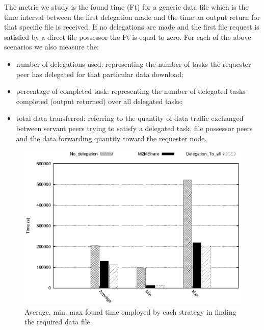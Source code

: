 The metric we study is the found time (Ft) for a generic data file which is the time interval between the first delegation made and the time an output return for that specific file is
received. If no delegations are made and the first file request is satisfied by a direct file possessor the Ft is equal to zero. For each of the above scenarios we also measure the:
\begin{itemize}
\item number of delegations used: representing the number of tasks the requester peer has delegated for that particular data download;
\item percentage of completed task: representing the number of delegated tasks completed (output returned) over all delegated tasks;
\item total data transferred: referring to the quantity of data traffic exchanged between servant peers trying to satisfy a delegated task, file possessor peers and the data forwarding quantity toward the requester node.
\end{itemize}

\begin{figure}[!htbp]
\centering
\includegraphics{grafici/tempi.eps}
\caption{Average, min. max found time employed by each strategy in finding the required data file.}
\label{graficoTempiVF}
\end{figure}

